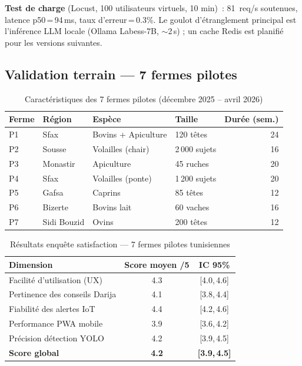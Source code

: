 \noindent\textbf{Test de charge} (Locust, 100 utilisateurs virtuels, 10 min)~:
81~req/s soutenues, latence p50\,=\,94\,ms, taux d'erreur\,=\,0.3\%.
Le goulot d'étranglement principal est l'inférence LLM locale
(Ollama Labess-7B, $\sim$2\,s) ; un cache Redis est planifié pour les versions suivantes.

\subsection{Validation terrain --- 7 fermes pilotes}

\begin{table}[H]
\centering
\caption{Caractéristiques des 7 fermes pilotes (décembre 2025 -- avril 2026)}
\label{tab:fermes_pilotes}
\small
\renewcommand{\arraystretch}{1.2}
\begin{tabular}{@{}llllr@{}}
\toprule
\textbf{Ferme} & \textbf{Région} & \textbf{Espèce} & \textbf{Taille} & \textbf{Durée (sem.)} \\
\midrule
P1 & Sfax        & Bovins + Apiculture   & 120 têtes      & 24 \\
P2 & Sousse      & Volailles (chair)     & 2\,000 sujets  & 16 \\
P3 & Monastir    & Apiculture            & 45 ruches      & 20 \\
P4 & Sfax        & Volailles (ponte)     & 1\,200 sujets  & 20 \\
P5 & Gafsa       & Caprins               & 85 têtes       & 12 \\
P6 & Bizerte     & Bovins lait           & 60 vaches      & 16 \\
P7 & Sidi Bouzid & Ovins                 & 200 têtes      & 12 \\
\bottomrule
\end{tabular}
\end{table}

\begin{table}[H]
\centering
\caption{Résultats enquête satisfaction --- 7 fermes pilotes tunisiennes}
\label{tab:satisfaction}
\small
\renewcommand{\arraystretch}{1.25}
\begin{tabular}{@{}lcc@{}}
\toprule
\textbf{Dimension} & \textbf{Score moyen /5} & \textbf{IC 95\%} \\
\midrule
Facilité d'utilisation (UX)    & 4.3 & [4.0,\,4.6] \\
Pertinence des conseils Darija & 4.1 & [3.8,\,4.4] \\
Fiabilité des alertes IoT      & 4.4 & [4.2,\,4.6] \\
Performance PWA mobile         & 3.9 & [3.6,\,4.2] \\
Précision détection YOLO       & 4.2 & [3.9,\,4.5] \\
\midrule
\textbf{Score global}          & \textbf{4.2} & \textbf{[3.9,\,4.5]} \\
\bottomrule
\end{tabular}
\end{table}

